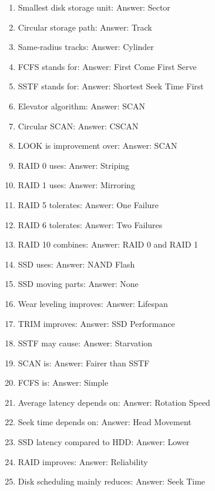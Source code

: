 \begin{enumerate}
\item Smallest disk storage unit:
Answer: Sector

\item Circular storage path:
Answer: Track

\item Same-radius tracks:
Answer: Cylinder

\item FCFS stands for:
Answer: First Come First Serve

\item SSTF stands for:
Answer: Shortest Seek Time First

\item Elevator algorithm:
Answer: SCAN

\item Circular SCAN:
Answer: CSCAN

\item LOOK is improvement over:
Answer: SCAN

\item RAID 0 uses:
Answer: Striping

\item RAID 1 uses:
Answer: Mirroring

\item RAID 5 tolerates:
Answer: One Failure

\item RAID 6 tolerates:
Answer: Two Failures

\item RAID 10 combines:
Answer: RAID 0 and RAID 1

\item SSD uses:
Answer: NAND Flash

\item SSD moving parts:
Answer: None

\item Wear leveling improves:
Answer: Lifespan

\item TRIM improves:
Answer: SSD Performance

\item SSTF may cause:
Answer: Starvation

\item SCAN is:
Answer: Fairer than SSTF

\item FCFS is:
Answer: Simple

\item Average latency depends on:
Answer: Rotation Speed

\item Seek time depends on:
Answer: Head Movement

\item SSD latency compared to HDD:
Answer: Lower

\item RAID improves:
Answer: Reliability

\item Disk scheduling mainly reduces:
Answer: Seek Time
\end{enumerate}

